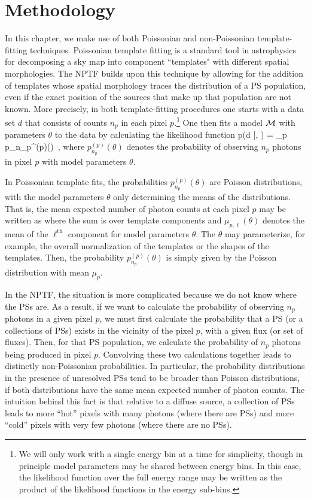 \section{Methodology} 
\label{sec:methodology}

In this chapter, we make use of both Poissonian and non-Poissonian template-fitting techniques.  
Poissonian template fitting is a standard tool in astrophysics for decomposing a sky map into component ``templates" with different spatial morphologies.  The NPTF builds upon this technique by allowing for the addition of templates whose spatial morphology traces the distribution of a PS population, even if the exact position of the sources that make up that population are not known.  More precisely, in both template-fitting procedures one starts with a data set $d$ that consists of counts $n_p$ in each pixel $p$.\footnote{We will only work with a single energy bin at a time for simplicity, though in principle model parameters may be shared between energy bins.  In this case, the likelihood function over the full energy range may be written as the product of the likelihood functions in the energy sub-bins.}  One then fits a model ${\cal M}$ with parameters $\theta$ to the data by calculating the likelihood function 
\be
p(d |\theta, ) = \prod_p p_{n_p}^{(p)}(\theta) \,,
\label{eq:likelihood_igrb}
\ee
where $p_{n_p}^{(p)}(\theta)$ denotes the probability of observing $n_p$ photons in pixel $p$ with model parameters $\theta$.

In Poissonian template fits, the probabilities $p_{n_p}^{(p)}(\theta)$ are Poisson distributions, with the model parameters $\theta$ only determining the means of the distributions.  That is, the mean expected number of photon counts at each pixel $p$ may be written as 
where the sum is over template components and $\mu_{p, \ell} (\theta)$ denotes the mean of the $\ell^\text{th}$ component for model parameters $\theta$.  The $\theta$ may parameterize, for example, the overall normalization of the templates or the shapes of the templates.  Then, the probability $p_{n_p}^{(p)}(\theta)$ is simply given by the Poisson distribution with mean $\mu_p$.  

In the NPTF, the situation is more complicated because we do not know where the PSs are.  As a result, if we want to calculate the probability of observing $n_p$ photons in a given pixel $p$, we must first calculate the probability that a PS (or a collections of PSs) exists in the vicinity of the pixel $p$, with a given flux (or set of fluxes).  Then, for that PS population, we calculate the probability of $n_p$ photons being produced in pixel $p$.  Convolving these two calculations together leads to distinctly non-Poissonian probabilities.  In particular, the probability distributions in the presence of unresolved PSs tend to be broader than Poisson distributions, if both distributions have the same mean expected number of photon counts.  The intuition behind this fact is that relative to a diffuse source, a collection of PSs leads to more ``hot'' pixels with many photons (where there are PSs) and more ``cold'' pixels with very few photons (where there are no PSs).  

